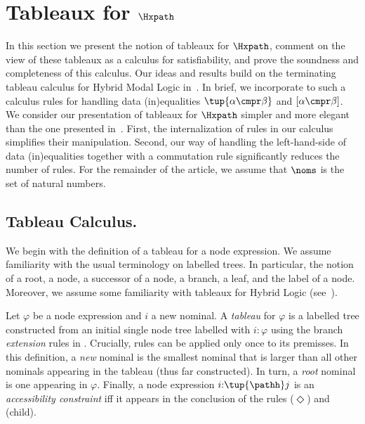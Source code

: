 \section{Tableaux for $\Hxpath$} \label{sec:tableaux}

In this section we present the notion of tableaux for $\Hxpath$, comment on the view of these tableaux as a calculus for satisfiability, and prove the soundness and completeness of this calculus.
Our ideas and results build on the terminating tableau calculus for Hybrid Modal Logic in~\cite{BolanderB07}.
In brief, we incorporate to such a calculus rules for handling data (in)equalities $\tup{\alpha \cmpr \beta}$ and $[\alpha \cmpr \beta]$.
We consider our presentation of tableaux for $\Hxpath$ simpler and more elegant than the one presented in~\cite{ArecesFS17}.
First, the internalization of rules in our calculus simplifies their manipulation.
Second, our way of handling the left-hand-side of data (in)equalities together with a commutation rule significantly reduces the number of rules.
For the remainder of the article, we assume that $\noms$ is the set of natural numbers.

\subsection{Tableau Calculus.}
\label{subsec:rules}

We begin with the definition of a tableau for a node expression.
We assume familiarity with the usual terminology on labelled trees.
In particular, the  notion of a root, a node, a successor of a node, a branch, a leaf, and the label of a node.
Moreover, we assume some familiarity with tableaux for Hybrid Logic (see~\cite{BolanderB07}).

\begin{defi}\label{def:tableau}
    Let $\varphi$ be a node expression and $i$ a new nominal.
    A \emph{tableau} for $\varphi$ is a labelled tree constructed from an initial single node tree labelled with $i{:}\varphi$ using the branch \emph{extension} rules in . Crucially, rules can be applied only once to its premisses. 
    In this definition, a \emph{new} nominal is the smallest nominal that is larger than all other nominals appearing in the tableau (thus far constructed).
    In turn, a \emph{root} nominal is one appearing in $\varphi$.
    Finally, a node expression $i{:}\tup{\pathh}j$ is an \emph{accessibility constraint} iff it appears in the conclusion of the rules ($\Diamond$) and (child).
\end{defi}

